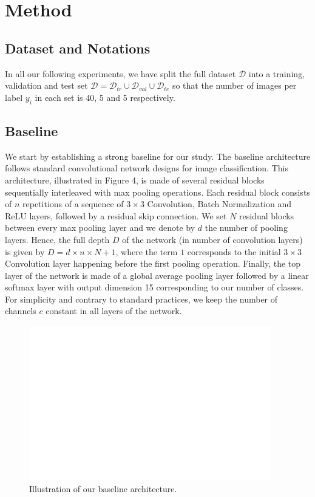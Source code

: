 \documentclass[10pt,twocolumn,letterpaper]{article}
\begin{document}
\section{Method}

\subsection{Dataset and Notations}

In all our following experiments, we have split the full dataset $\mathcal{D}$ into a training, validation and test set $\mathcal{D}=\mathcal{D}_{tr} \cup \mathcal{D}_{val} \cup \mathcal{D}_{te}$ so that the number of images per label $y_i$ in each set is 40, 5 and 5 respectively.

\subsection{Baseline}

We start by establishing a strong baseline for our study.
The baseline architecture follows standard convolutional network designs for image classification.
This architecture, illustrated in Figure 4, is made of several residual blocks 
sequentially interleaved with max pooling operations.
Each residual block consists of $n$ repetitions of a sequence of 
$3 \times 3$ Convolution, Batch Normalization and ReLU layers,
followed by a residual skip connection.
We set $N$ residual blocks between every max pooling layer
and we denote by $d$ the number of pooling layers.
Hence, the full depth $D$ of the network (in number of convolution layers) 
is given by $D=d \times n \times N +1$, where the term $1$ corresponds to the
initial $3 \times 3$ Convolution layer happening before the first pooling operation.
Finally, the top layer of the network is made of a global average pooling layer 
followed by a linear softmax layer with output dimension 15 corresponding to our number of classes.
For simplicity and contrary to standard practices, we keep the number of channels $c$ constant 
in all layers of the network.

\begin{figure}[h]
	\centering
	\includegraphics[width=0.9\linewidth]{"./figures/Figure11"}
	\caption{
		Illustration of our baseline architecture.
	}
\end{figure}
\end{document}
